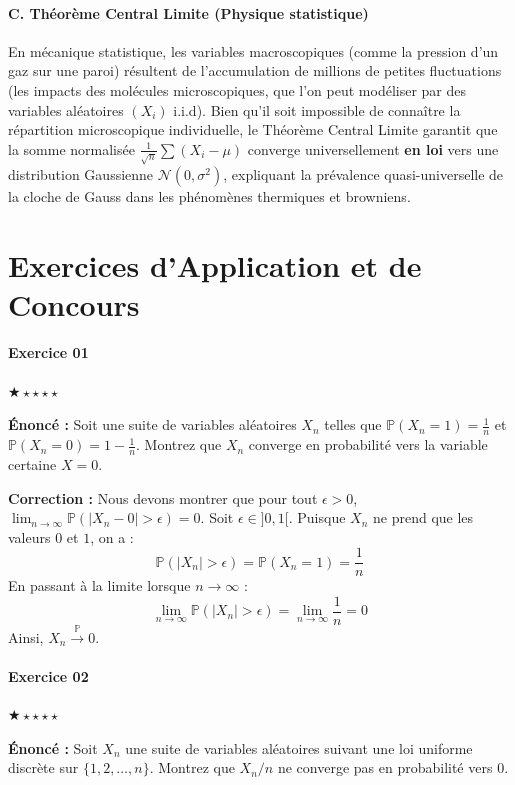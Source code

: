 \documentclass[11pt,a4paper]{article}
\begin{document}
\subsection{C. Théorème Central Limite (Physique statistique)}
En mécanique statistique, les variables macroscopiques (comme la pression d'un gaz sur une paroi) résultent de l'accumulation de millions de petites fluctuations (les impacts des molécules microscopiques, que l'on peut modéliser par des variables aléatoires $(X_i)$ i.i.d). Bien qu'il soit impossible de connaître la répartition microscopique individuelle, le Théorème Central Limite garantit que la somme normalisée $\frac{1}{\sqrt{n}} \sum (X_i - \mu)$ converge universellement \textbf{en loi} vers une distribution Gaussienne $\mathcal{N}(0, \sigma^2)$, expliquant la prévalence quasi-universelle de la cloche de Gauss dans les phénomènes thermiques et browniens.

\part{Exercices d'Application et de Concours}
\subsection*{Exercice 01}

\quad $\bigstar\star\star\star\star$

\textbf{Énoncé :}
Soit une suite de variables aléatoires $X_n$ telles que $\mathbb{P}(X_n = 1) = \frac{1}{n}$ et $\mathbb{P}(X_n = 0) = 1 - \frac{1}{n}$.
Montrez que $X_n$ converge en probabilité vers la variable certaine $X = 0$.

\textbf{Correction :}
Nous devons montrer que pour tout $\epsilon > 0$, $\lim_{n \to \infty} \mathbb{P}(|X_n - 0| > \epsilon) = 0$.
Soit $\epsilon \in ]0, 1[$. Puisque $X_n$ ne prend que les valeurs $0$ et $1$, on a :
$$ \mathbb{P}(|X_n| > \epsilon) = \mathbb{P}(X_n = 1) = \frac{1}{n} $$
En passant à la limite lorsque $n \to \infty$ :
$$ \lim_{n \to \infty} \mathbb{P}(|X_n| > \epsilon) = \lim_{n \to \infty} \frac{1}{n} = 0 $$
Ainsi, $X_n \xrightarrow{\mathbb{P}} 0$.


\subsection*{Exercice 02}

\quad $\bigstar\star\star\star\star$

\textbf{Énoncé :}
Soit $X_n$ une suite de variables aléatoires suivant une loi uniforme discrète sur $\{1, 2, \dots, n\}$.
Montrez que $X_n/n$ ne converge pas en probabilité vers $0$.
\end{document}
